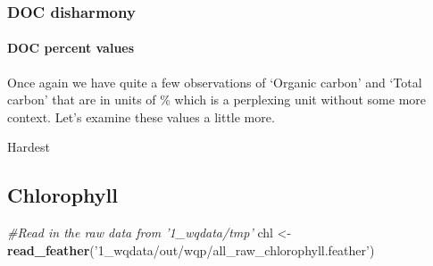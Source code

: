 \documentclass[]{article}
\newenvironment{Shaded}{\begin{snugshade}}{\end{snugshade}}
\newcommand{\CommentTok}[1]{\textcolor[rgb]{0.56,0.35,0.01}{\textit{#1}}}
\newcommand{\DecValTok}[1]{\textcolor[rgb]{0.00,0.00,0.81}{#1}}
\newcommand{\KeywordTok}[1]{\textcolor[rgb]{0.13,0.29,0.53}{\textbf{#1}}}
\newcommand{\NormalTok}[1]{#1}
\newcommand{\OperatorTok}[1]{\textcolor[rgb]{0.81,0.36,0.00}{\textbf{#1}}}
\newcommand{\StringTok}[1]{\textcolor[rgb]{0.31,0.60,0.02}{#1}}
\let\oldparagraph\paragraph
\renewcommand{\paragraph}[1]{\oldparagraph{#1}\mbox{}}
\begin{document}
\hypertarget{doc-disharmony}{%
\subsubsection{DOC disharmony}\label{doc-disharmony}}

\hypertarget{doc-percent-values}{%
\paragraph{DOC percent values}\label{doc-percent-values}}

Once again we have quite a few observations of `Organic carbon' and
`Total carbon' that are in units of \% which is a perplexing unit
without some more context. Let's examine these values a little more.

\begin{Shaded}
\end{Shaded}

Hardest

\hypertarget{chlorophyll}{%
\subsection{Chlorophyll}\label{chlorophyll}}

\begin{Shaded}
\begin{Highlighting}[]
\CommentTok{#Read in the raw data from '1_wqdata/tmp'}
\NormalTok{chl <-}\StringTok{ }\KeywordTok{read_feather}\NormalTok{(}\StringTok{'1_wqdata/out/wqp/all_raw_chlorophyll.feather'}\NormalTok{)}
\end{Highlighting}
\end{Shaded}
\end{document}

